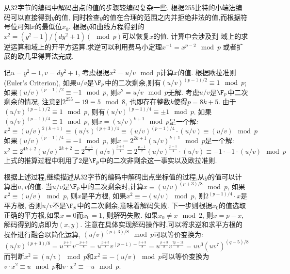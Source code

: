从32字节的编码中解码出点的值的步骤较编码复杂一些. 根据255比特的小端法编码可以直接得到$y$的值,
同时检查$y$的值在合理的范围之内并拒绝非法的值,而根据符号位可知$x$的最低位$x_0$.
根据$y$和曲线方程得到的$x^2 = (y^2-1) / (dy^2 + 1) (\mod p)$可以恢复$x$的值, 计算中会涉及到
域上的求逆运算和域上的开平方运算.求逆可以利用费马小定理$x^{-1} = x^{p-2} \mod p$
或者扩展的欧几里得算法完成.

记$u = y^2-1, v = dy^2 + 1$, 考虑根据$x^2 = u/v \mod p$计算$x$的值.
根据欧拉准则(Euler's Criterion),
如果$u/v$是$\F_p$中的二次剩余,则有$(u/v)^{(p-1)/2} \equiv 1 \mod p$;
如果$(u/v)^{(p-1)/2} \equiv -1 \mod p$, 则$x^2 = u/v \mod p$无解.
考虑$u/v$是$\F_p$中二次剩余的情况, 
注意到$2^{255}-19 \equiv 5 \mod 8$, 也即存在整数$k$使得$p = 8k + 5$.
由于$(u/v)^{(p-1)/2} \equiv 1 \mod p$, 则有$(u/v)^{(p-1)/4} \equiv \pm 1 \mod p$.
如果$(u/v)^{(p-1)/4} \equiv 1 \mod p$, 则$x = (u/v)^{k+1}\mod p$是一个解:
$$
x^2 \equiv (u/v)^{2(k+1)} \equiv (u/v)^{(p+3)/4} \equiv (u/v)^{(p-1)/4}\cdot (u/v) \equiv (u/v) \mod p 
$$
如果$(u/v)^{(p-1)/4} \equiv -1 \mod p$, 则$x = 2^{2k+1}(u/v)^{k+1}\mod p$是一个解:
$$
x^2 \equiv 2^{4k+2}(u/v)^{2k+2} \equiv 2^{\frac{p-1}{2}}(u/v)^{\frac{p+3}{4}} \equiv
 2^{\frac{p-1}{2}} (u/v)^{\frac{p-1}{4}}\cdot (u/v) \equiv -1 \cdot -1 \cdot (u/v) \mod p
$$
上式的推算过程中利用了2是$\F_p$中的二次非剩余这一事实以及欧拉准则.

根据上述过程,继续描述从32字节的编码中解码出点坐标值的过程,从$y$的值可以计算出$u, v$的值.
当$u/v$是$\F_p$中的二次剩余时,计算$x \equiv (u/v)^{(p+3)/8}\mod p$,
如果$x^2 \equiv (u/v) \mod p$, 则$x$是平方根,
如果$x^2 \equiv -(u/v)\mod p$, 则$2^{(p-1)/4} \cdot x$是平方根,
否则$u/v$不是$\F_p$中的二次剩余,意味着解码失败.
下一步则根据$x_0$的值选取正确的平方根,如果$x = 0$而$x_0 = 1$, 则解码失败.
如果$x_0 \neq x \mod 2$, 则$x = p-x$, 解码得到的点即为$(x,y)$.
注意在具体实现解码操作时,可以将求逆和求平方根的操作进行融合以简化运算,
$(u/v)^{(p+3)/8}\mod p$可以等价变换为:
$$
(u/v)^{(p+3)/8} = u^{\frac{p+3}{8}} v^{-\frac{p+3}{8}}
= u^{\frac{p+3}{8}} v^{(p-1)-\frac{p+3}{8}}
= u^{\frac{p+3}{8}} v^{\frac{7p-11}{8}}
= uv^3(uv^7)^{(q-5)/8} 
$$
而判断$x^2\equiv (u/v) \mod p$和$x^2 \equiv -(u/v) \mod p$可以等价变换为
$v \cdot x^2 \equiv u \mod p$和$v \cdot x^2 \equiv -u \mod p$.

